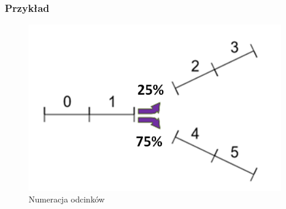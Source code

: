 \documentclass[12pt]{book}
\theoremstyle{plain}
\begin{document}
\subsubsection{Przykład}
\begin{figure}[H]
	\centering
	\includegraphics[width=14cm]{images/env_11_procenty_2}
	\caption{Numeracja odcinków}
	\label{fig:ctm_przyklad}\end{figure}
\end{document}
